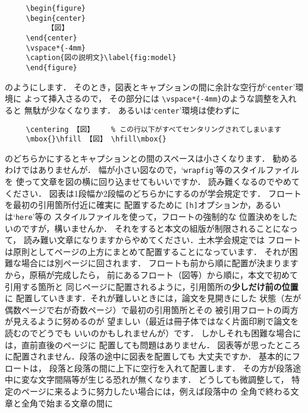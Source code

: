\documentclass[onecolumn]{jsce}  %
\begin{document}
\begin{Enumerate}
\renewcommand{\baselinestretch}{0.75}\small\normalsize
\begin{verbatim}
     \begin{figure}
     \begin{center}
          【図】
     \end{center}
     \vspace*{-4mm}
     \caption{図の説明文}\label{fig:model}
     \end{figure}
\end{verbatim}
\renewcommand{\baselinestretch}{1}\small\normalsize
のようにします．
そのとき，図表とキャプションの間に余計な空行が`{\tt center}'環境に
よって挿入さるので，
その部分には \verb+\vspace*{-4mm}+のような調整を入れると
無駄が少なくなります．
あるいは`{\tt center}'環境は使わずに

\renewcommand{\baselinestretch}{0.75}\small\normalsize
\begin{verbatim}
     \centering 【図】    % この行以下がすべてセンタリングされてしまいます
     \mbox{}\hfill 【図】 \hfill\mbox{}
\end{verbatim}
\renewcommand{\baselinestretch}{1}\small\normalsize
のどちらかにするとキャプションとの間のスペースは小さくなります．
勧めるわけではありませんが．
%
\Qitem 幅が小さい図なので，`{\tt wrapfig}'等のスタイルファイルを
使って文章を図の横に回り込ませてもいいですか．
\Aitem 読み難くなるのでやめてください．
図表は1段幅か2段幅のどちらかにするのが学会規定です．
%
\Qitem フロートを最初の引用箇所付近に確実に
配置するために \verb+[h]+オプションか，あるいは`{\tt here}'等の
スタイルファイルを使って，フロートの強制的な
位置決めをしたいのですが，構いませんか．
\Aitem それをすると本文の組版が制限されることになって，
読み難い文章になりますからやめてください．土木学会規定では
フロートは原則としてページの上方にまとめて配置することになっています．
それが困難な場合には別ページに回されます．
フロートも前から順に配置が決まりますから，原稿が完成したら，
前にあるフロート（図等）から順に，本文で初めて引用する箇所と
同じページに配置されるように，引用箇所の{\bf 少しだけ前の位置}に
配置していきます．それが難しいときには，論文を見開きにした
状態（左が偶数ページで右が奇数ページ）で最初の引用箇所とその
被引用フロートの両方が見えるように努めるのが
望ましい（最近は冊子体ではなく片面印刷で論文を読むのでどうでも
いいのかもしれませんが）です．
しかしそれも困難な場合には，直前直後のページに
配置しても問題はありません．
%
\Qitem 図表等が思ったところに配置されません．段落の途中に図表を配置しても
大丈夫ですか．
\Aitem 基本的にフロートは，
段落と段落の間に上下に空行を入れて配置します．
その方が段落途中に変な文字間隔等が生じる恐れが無くなります．
どうしても微調整して，
特定のページに来るように努力したい場合には，例えば段落中の
全角で終わる文章と全角で始まる文章の間に


\end{Enumerate}
\end{document}
